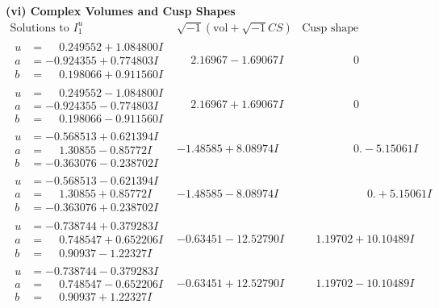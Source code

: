 \documentclass[1p]{elsarticle_modified}
\theoremstyle{definition}
\newcommand{\I}{\sqrt{-1}}
\begin{document}
\newpage\flushleft \textbf{(vi) Complex Volumes and Cusp Shapes}
$$\begin{array}{c|c|c}  
\text{Solutions to }I^u_{1}& \I (\text{vol} + \sqrt{-1}CS) & \text{Cusp shape}\\
 \hline 
\begin{aligned}
u &= \phantom{-}0.249552 + 1.084800 I \\
a &= -0.924355 + 0.774803 I \\
b &= \phantom{-}0.198066 + 0.911560 I\end{aligned}
 & \phantom{-}2.16967 - 1.69067 I & \phantom{-0.000000 } 0 \\ \hline\begin{aligned}
u &= \phantom{-}0.249552 - 1.084800 I \\
a &= -0.924355 - 0.774803 I \\
b &= \phantom{-}0.198066 - 0.911560 I\end{aligned}
 & \phantom{-}2.16967 + 1.69067 I & \phantom{-0.000000 } 0 \\ \hline\begin{aligned}
u &= -0.568513 + 0.621394 I \\
a &= \phantom{-}1.30855 - 0.85772 I \\
b &= -0.363076 - 0.238702 I\end{aligned}
 & -1.48585 + 8.08974 I & \phantom{-0.000000 } 0. - 5.15061 I \\ \hline\begin{aligned}
u &= -0.568513 - 0.621394 I \\
a &= \phantom{-}1.30855 + 0.85772 I \\
b &= -0.363076 + 0.238702 I\end{aligned}
 & -1.48585 - 8.08974 I & \phantom{-0.000000 -}0. + 5.15061 I \\ \hline\begin{aligned}
u &= -0.738744 + 0.379283 I \\
a &= \phantom{-}0.748547 + 0.652206 I \\
b &= \phantom{-}0.90937 - 1.22327 I\end{aligned}
 & -0.63451 - 12.52790 I & \phantom{-}1.19702 + 10.10489 I \\ \hline\begin{aligned}
u &= -0.738744 - 0.379283 I \\
a &= \phantom{-}0.748547 - 0.652206 I \\
b &= \phantom{-}0.90937 + 1.22327 I\end{aligned}
 & -0.63451 + 12.52790 I & \phantom{-}1.19702 - 10.10489 I \\ \hline\begin{aligned}

\end{aligned}
\end{array}$$
\end{document}
